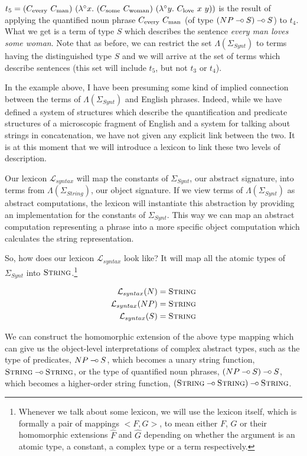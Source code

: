 $t_5 = (\synt{every}\ \synt{man})\ (\lambda^{\circ}
x.\ (\synt{some}\ \synt{woman})\ (\lambda^{\circ}
y.\ \synt{love}\ x\ y))$ is the result of applying the quantified noun
phrase $C_{\textrm{every}}\ C_{\textrm{man}}$ (of type $(NP \mathbin{{-}\mkern-3.5mu{\circ}} S) \mathbin{{-}\mkern-3.5mu{\circ}} S$) to
$t_4$. What we get is a term of type $S$ which describes the sentence
\emph{every man loves some woman}. Note that as before, we can restrict
the set $\Lambda(\Sigma_{Synt})$ to terms having the distinguished type
$S$ and we will arrive at the set of terms which describe sentences
(this set will include $t_5$, but not $t_3$ or $t_4$).

In the example above, I have been presuming some kind of implied
connection between the terms of $\Lambda(\Sigma_{Synt})$ and English
phrases. Indeed, while we have defined a system of structures which
describe the quantification and predicate structures of a microscopic
fragment of English and a system for talking about strings in
concatenation, we have not given any explicit link between the two. It
is at this moment that we will introduce a lexicon to link these two
levels of description.

Our lexicon $\mathcal{L}_{syntax}$ will map the constants of
$\Sigma_{Synt}$, our abstract signature, into terms from
$\Lambda(\Sigma_{String})$, our object signature. If we view terms of
$\Lambda(\Sigma_{Synt})$ as abstract computations, the lexicon will
instantiate this abstraction by providing an implementation for the
constants of $\Sigma_{Synt}$. This way we can map an abstract
computation representing a phrase into a more specific object
computation which calculates the string representation.

So, how does our lexicon $\mathcal{L}_{syntax}$ look like? It will map
all the atomic types of $\Sigma_{Synt}$ into
$\textsc{String}$.\footnote{Whenever we talk about some lexicon, we will
  use the lexicon itself, which is formally a pair of mappings
  $\mathopen{<}F, G\mathclose{>}$, to mean either $F$, $G$ or their
  homomorphic extensions $\hat{F}$ and $\hat{G}$ depending on whether
  the argument is an atomic type, a constant, a complex type or a term
  respectively.}

\begin{align*}
\mathcal{L}_{syntax}(N) &= \textsc{String} \\
\mathcal{L}_{syntax}(NP) &= \textsc{String} \\
\mathcal{L}_{syntax}(S) &= \textsc{String}
\end{align*}

We can construct the homomorphic extension of the above type mapping
which can give us the object-level interpretations of complex abstract
types, such as the type of predicates, $NP \mathbin{{-}\mkern-3.5mu{\circ}} S$, which becomes a
unary string function, $\textsc{String} \mathbin{{-}\mkern-3.5mu{\circ}} \textsc{String}$, or the
type of quantified noun phrases, $(NP \mathbin{{-}\mkern-3.5mu{\circ}} S) \mathbin{{-}\mkern-3.5mu{\circ}} S$, which becomes a
higher-order string function, $(\textsc{String} \mathbin{{-}\mkern-3.5mu{\circ}} \textsc{String})
\mathbin{{-}\mkern-3.5mu{\circ}} \textsc{String}$.

